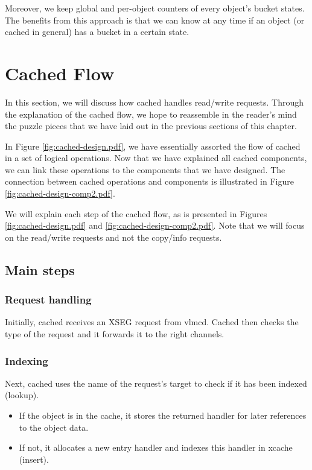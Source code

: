 Moreover, we keep global and per-object counters of every object's bucket 
states. The benefits from this approach is that we can know at any time if an 
object (or cached in general) has a bucket in a certain state.

\section{Cached Flow}\label{sec:cached-flow-design}

In this section, we will discuss how cached handles read/write requests.  
Through the explanation of the cached flow, we hope to reassemble in the 
reader's mind the puzzle pieces that we have laid out in the previous sections 
of this chapter.

In Figure \ref{fig:cached-design.pdf}, we have essentially assorted the flow of 
cached in a set of logical operations. Now that we have explained all cached 
components, we can link these operations to the components that we have 
designed. The connection between cached operations and components is 
illustrated in Figure \ref{fig:cached-design-comp2.pdf}.


We will explain each step of the cached flow, as is presented in Figures 
\ref{fig:cached-design.pdf} and \ref{fig:cached-design-comp2.pdf}. Note that we
will focus on the read/write requests and not the copy/info requests.

\subsection{Main steps}

\subsubsection{Request handling}

Initially, cached receives an XSEG request from vlmcd. Cached then checks the 
type of the request and it forwards it to the right channels.

\subsubsection{Indexing}

Next, cached uses the name of the request's target to check if it has been 
indexed (lookup). 

\begin{itemize}
	\item If the object is in the cache, it stores the returned handler for 
		later references to the object data.
	\item If not, it allocates a new entry handler and indexes this handler 
		in xcache (insert).
\end{itemize}

